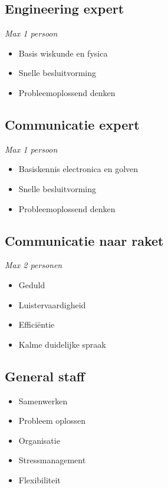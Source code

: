 \subsection{Engineering expert}
\textit{Max 1 persoon}
\begin{itemize}
    \item Basis wiskunde en fysica
    \item Snelle besluitvorming
    \item Probleemoplossend denken
\end{itemize}

\subsection{Communicatie expert}
\textit{Max 1 persoon}
\begin{itemize}
    \item Basiskennis electronica en golven
    \item Snelle besluitvorming
    \item Probleemoplossend denken
\end{itemize}

\subsection{Communicatie naar raket}
\textit{Max 2 personen}
\begin{itemize}
    \item Geduld
    \item Luistervaardigheid
    \item Efficiëntie
    \item Kalme duidelijke spraak
\end{itemize}

\subsection{General staff}
\begin{itemize}
    \item Samenwerken
    \item Probleem oplossen
    \item Organisatie
    \item Stressmanagement
    \item Flexibiliteit
\end{itemize}